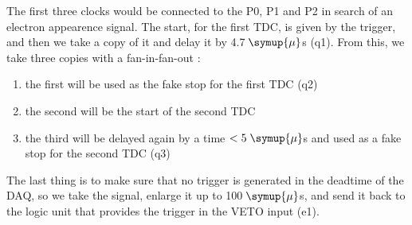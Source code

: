 The first three clocks would be connected to the P0, P1 and P2 in search of an electron
appearence signal. The start, for the first TDC, is given by the trigger, and then we take a copy
of it and delay it by 4.7$\;\symup{\mu}$s (q1). From this, we take three copies with a fan-in-fan-out :
\begin{enumerate}
\item the first will be used as the fake stop for the first TDC (q2)
\item the second will be the start of the second TDC
\item the third will be delayed again by a time $<5\;\symup{\mu}$s and used as a fake stop for the second TDC (q3)
\end{enumerate}
The last thing is to make sure that no trigger is generated in the deadtime of the DAQ, so we take the signal, enlarge it up to 100$\;\symup{\mu}$s, and send it back to the logic unit that provides the trigger in the VETO input (e1).\\
